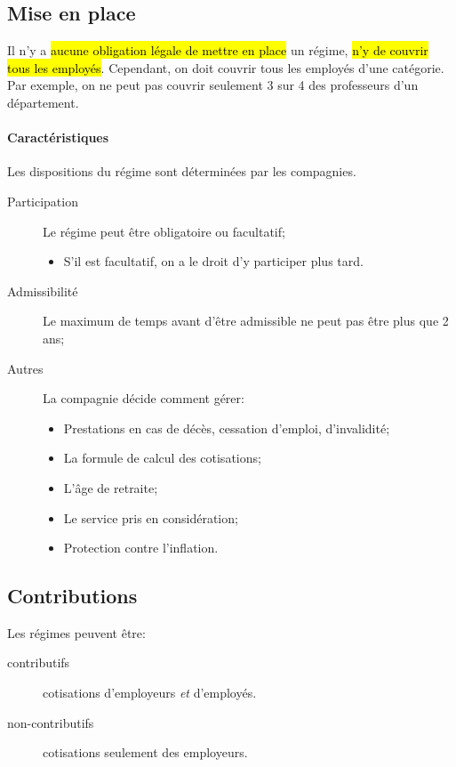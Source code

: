 \documentclass[10pt, french]{article}
\begin{document}
\begin{multicols*}{3}
\subsection*{Mise en place}
Il n'y a \hl{aucune obligation légale de mettre en place} un régime, \hl{n'y de couvrir tous les employés}. Cependant, on doit couvrir tous les employés d'une catégorie. Par exemple, on ne peut pas couvrir seulement 3 sur 4 des professeurs d'un département.

\paragraph*{Caractéristiques}	Les dispositions du régime sont déterminées par les compagnies.
\begin{description}
	\item[Participation]	Le régime peut être obligatoire ou facultatif;
		\begin{itemize}[leftmargin = *]
		\item	S'il est facultatif, on a le droit d'y participer plus tard.
		\end{itemize}
	\item[Admissibilité]	Le maximum de temps avant d'être admissible ne peut pas être plus que 2 ans;
	\item[Autres]	La compagnie décide comment gérer:
		\begin{itemize}[leftmargin = *]
		\item	Prestations en cas de décès, cessation d'emploi, d'invalidité;
		\item	La formule de calcul des cotisations;
		\item	L'âge de retraite;
		\item	Le service pris en considération;
		\item	Protection contre l'inflation.
		\end{itemize}
\end{description}


\subsection*{Contributions}
Les régimes peuvent être:
\begin{description}
	\item[contributifs]	cotisations d'employeurs \textit{et} d'employés.
	\item[non-contributifs]	cotisations seulement des employeurs.
\end{description}


\end{multicols*}
\end{document}
